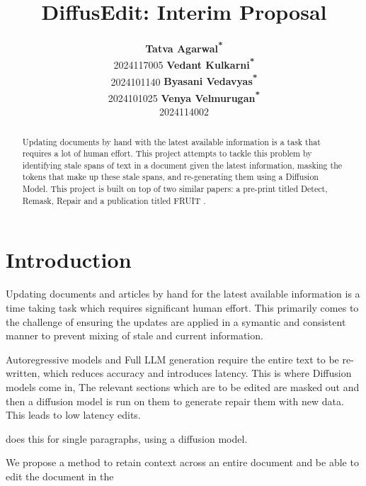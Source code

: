 \documentclass[11pt]{article}
\title{DiffusEdit: Interim Proposal}
\author{
  \textbf{Tatva Agarwal\textsuperscript{*}} \\ 2024117005 \And
  \textbf{Vedant Kulkarni\textsuperscript{*}} \\ 2024101140 \And
  \textbf{Byasani Vedavyas\textsuperscript{*}} \\ 2024101025 \And
  \textbf{Venya Velmurugan\textsuperscript{*}} \\ 2024114002
}
\begin{document}
\maketitle

\renewcommand{\thefootnote}{\fnsymbol{footnote}}
\renewcommand{\thefootnote}{\arabic{footnote}}
\setcounter{footnote}{0}

\begin{abstract}
Updating documents by hand with the latest available information is a task that requires a lot of human effort. This project attempts to tackle this problem by identifying stale spans of text in a document given the latest information, masking the tokens that make up these stale spans, and re-generating them using a Diffusion Model. This project is built on top of two similar papers: a pre-print titled Detect, Remask, Repair \citep{zou-etal-2026-detect} and a publication titled FRUIT \citep{iv-etal-2022-fruit}.
\end{abstract}

\section{Introduction}


Updating documents and articles by hand for the latest available information is a time taking task which requires significant human effort. This primarily comes to the challenge of ensuring the updates are applied in a symantic and consistent manner to prevent mixing of stale and current information. 

Autoregressive models and Full LLM generation require the entire text to be re-written, which reduces accuracy and introduces latency. This is where Diffusion models come in, The relevant sections which are to be edited are masked out and then a diffusion model is run on them to generate repair them with new data. This leads to low latency edits. 

\citep{zou-etal-2026-detect} does this for single paragraphs, using a diffusion model. 

We propose a method to retain context across an entire document and be able to edit the document in the 





\end{document}
